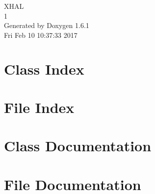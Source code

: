 \documentclass[a4paper]{book}
\begin{document}
\hypersetup{pageanchor=false}
\begin{titlepage}
\vspace*{7cm}
\begin{center}
{\Large XHAL \\[1ex]\large 1 }\\
\vspace*{1cm}
{\large Generated by Doxygen 1.6.1}\\
\vspace*{0.5cm}
{\small Fri Feb 10 10:37:33 2017}\\
\end{center}
\end{titlepage}
\clearemptydoublepage
{}
\tableofcontents
\clearemptydoublepage
{}
\hypersetup{pageanchor=true}
\chapter{Class Index}

\chapter{File Index}

\chapter{Class Documentation}










\chapter{File Documentation}



\printindex
\end{document}
